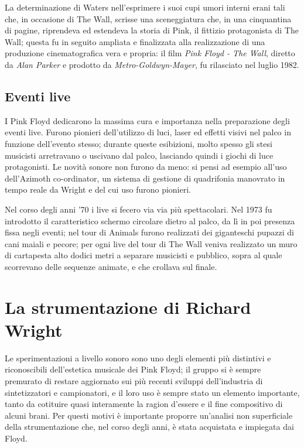 \documentclass[class=book, crop=false, oneside, 12pt]{standalone}
\begin{document}
    La determinazione di Waters nell'esprimere i suoi cupi umori interni erani tali che, in occasione di The Wall, scrisse una sceneggiatura che, in una cinquantina di pagine, riprendeva ed estendeva la storia di Pink, il fittizio protagonista di The Wall; questa fu in seguito ampliata e finalizzata alla realizzazione di una produzione cinematografica vera e propria: il film \emph{Pink Floyd - The Wall}, diretto da \emph{Alan Parker} e prodotto da \emph{Metro-Goldwyn-Mayer}, fu rilasciato nel luglio 1982.

    \subsection{Eventi live}
    I Pink Floyd dedicarono la massima cura e importanza nella preparazione degli eventi live. Furono pionieri dell'utilizzo di luci, laser ed effetti visivi nel palco in funzione dell'evento stesso; durante queste esibizioni, molto spesso gli stesi musicisti arretravano o uscivano dal palco, lasciando quindi i giochi di luce protagonisti. Le novità sonore non furono da meno: si pensi ad esempio all'uso dell'Azimoth co-ordinator, un sistema di gestione di quadrifonia manovrato in tempo reale da Wright e del cui uso furono pionieri.

    Nel corso degli anni '70 i live si fecero via via più spettacolari. Nel 1973 fu introdotto il caratteristico schermo circolare dietro al palco, da lì in poi presenza fissa negli eventi; nel tour di Animals furono realizzati dei giganteschi pupazzi di cani maiali e pecore; per ogni live del tour di The Wall veniva realizzato un muro di cartapesta alto dodici metri a separare musicisti e pubblico, sopra al quale scorrevano delle sequenze animate, e che crollava sul finale.



    \section{La strumentazione di Richard Wright}
    Le sperimentazioni a livello sonoro sono uno degli elementi più distintivi e riconoscibili dell'estetica musicale dei Pink Floyd; il gruppo si è sempre premurato di restare aggiornato sui più recenti sviluppi dell'industria di sintetizzatori e campionatori, e il loro uso è sempre stato un elemento importante, tanto da cotituire quasi interamente la ragion d'essere e il fine compositivo di alcuni brani. Per questi motivi è importante proporre un'analisi non superficiale della strumentazione che, nel corso degli anni, è stata acquistata e impiegata dai Floyd.
\end{document}
